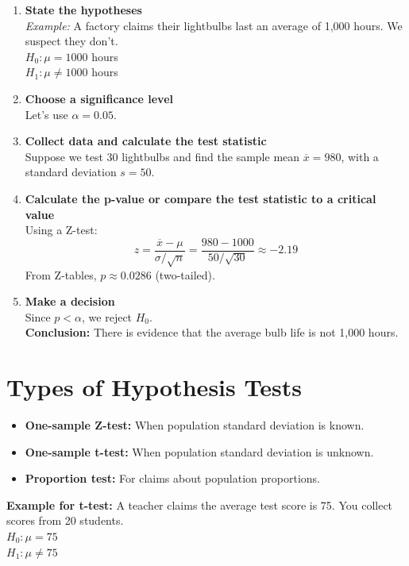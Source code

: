 \documentclass[twoside]{book}
\begin{document}
\begin{enumerate}
    \item \textbf{State the hypotheses} \\
    \textit{Example:} A factory claims their lightbulbs last an average of 1,000 hours. We suspect they don’t.\\
    \( H_0: \mu = 1000 \) hours \\
    \( H_1: \mu \neq 1000 \) hours
    
    \item \textbf{Choose a significance level} \\
    Let’s use \( \alpha = 0.05 \).
    
    \item \textbf{Collect data and calculate the test statistic} \\
    Suppose we test 30 lightbulbs and find the sample mean \( \overline{x} = 980 \), with a standard deviation \( s = 50 \).
    
    \item \textbf{Calculate the p-value or compare the test statistic to a critical value} \\
    Using a Z-test:
    \[
    z = \frac{\overline{x} - \mu}{\sigma / \sqrt{n}} = \frac{980 - 1000}{50 / \sqrt{30}} \approx -2.19
    \]
    From Z-tables, \( p \approx 0.0286 \) (two-tailed).
    
    \item \textbf{Make a decision} \\
    Since \( p < \alpha \), we reject \( H_0 \). \\
    \textbf{Conclusion:} There is evidence that the average bulb life is not 1,000 hours.
\end{enumerate}

\section{Types of Hypothesis Tests}

\begin{itemize}
    \item \textbf{One-sample Z-test:} When population standard deviation is known.
    \item \textbf{One-sample t-test:} When population standard deviation is unknown.
    \item \textbf{Proportion test:} For claims about population proportions.
\end{itemize}

\textbf{Example for t-test:} A teacher claims the average test score is 75. You collect scores from 20 students. \\
\( H_0: \mu = 75 \) \\
\( H_1: \mu \neq 75 \)
\end{document}
